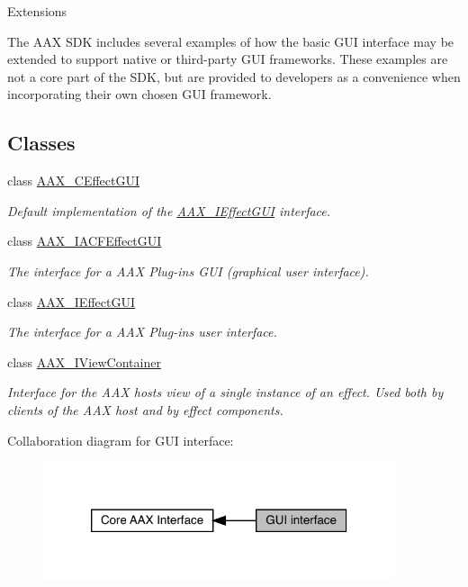 \begin{DoxyParagraph}{Extensions}

\end{DoxyParagraph}
The A\+AX S\+DK includes several examples of how the basic G\+UI interface may be extended to support native or third-\/party G\+UI frameworks. These examples are not a core part of the S\+DK, but are provided to developers as a convenience when incorporating their own chosen G\+UI framework. \subsection*{Classes}
\begin{DoxyCompactItemize}
\item 
class \mbox{\hyperlink{a01477}{A\+A\+X\+\_\+\+C\+Effect\+G\+UI}}
\begin{DoxyCompactList}\small\item\em Default implementation of the \mbox{\hyperlink{a01821}{A\+A\+X\+\_\+\+I\+Effect\+G\+UI}} interface. \end{DoxyCompactList}\item 
class \mbox{\hyperlink{a01665}{A\+A\+X\+\_\+\+I\+A\+C\+F\+Effect\+G\+UI}}
\begin{DoxyCompactList}\small\item\em The interface for a A\+AX Plug-\/in\textquotesingle{}s G\+UI (graphical user interface). \end{DoxyCompactList}\item 
class \mbox{\hyperlink{a01821}{A\+A\+X\+\_\+\+I\+Effect\+G\+UI}}
\begin{DoxyCompactList}\small\item\em The interface for a A\+AX Plug-\/in\textquotesingle{}s user interface. \end{DoxyCompactList}\item 
class \mbox{\hyperlink{a01889}{A\+A\+X\+\_\+\+I\+View\+Container}}
\begin{DoxyCompactList}\small\item\em Interface for the A\+AX host\textquotesingle{}s view of a single instance of an effect. Used both by clients of the A\+AX host and by effect components. \end{DoxyCompactList}\end{DoxyCompactItemize}
Collaboration diagram for G\+UI interface\+:
\nopagebreak
\begin{figure}[H]
\begin{center}
\leavevmode
\includegraphics[width=293pt]{a00799}
\end{center}
\end{figure}
